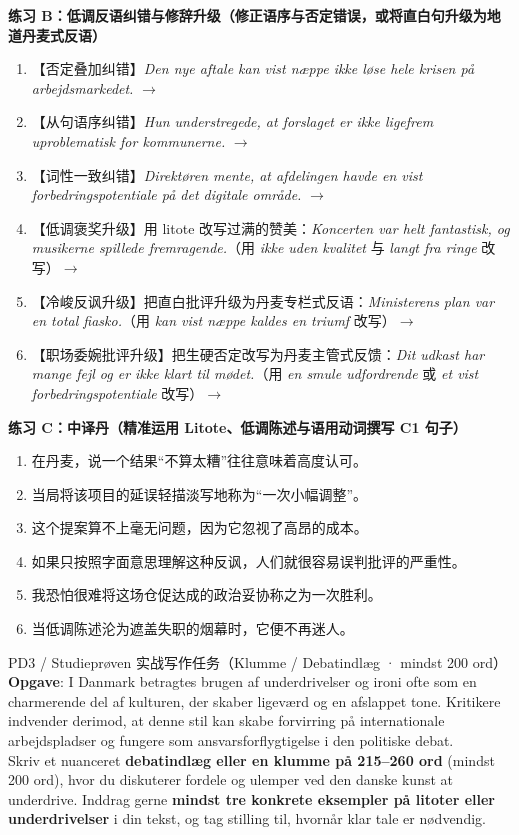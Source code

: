 \textbf{练习 B：低调反语纠错与修辞升级（修正语序与否定错误，或将直白句升级为地道丹麦式反语）}
\begin{enumerate}
  \item 【否定叠加纠错】\textit{Den nye aftale kan vist næppe ikke løse hele krisen på arbejdsmarkedet.} $\rightarrow$
  \item 【从句语序纠错】\textit{Hun understregede, at forslaget er ikke ligefrem uproblematisk for kommunerne.} $\rightarrow$
  \item 【词性一致纠错】\textit{Direktøren mente, at afdelingen havde en vist forbedringspotentiale på det digitale område.} $\rightarrow$
  \item 【低调褒奖升级】用 litote 改写过满的赞美：\textit{Koncerten var helt fantastisk, og musikerne spillede fremragende.}（用 \textit{ikke uden kvalitet} 与 \textit{langt fra ringe} 改写）$\rightarrow$
  \item 【冷峻反讽升级】把直白批评升级为丹麦专栏式反语：\textit{Ministerens plan var en total fiasko.}（用 \textit{kan vist næppe kaldes en triumf} 改写）$\rightarrow$
  \item 【职场委婉批评升级】把生硬否定改写为丹麦主管式反馈：\textit{Dit udkast har mange fejl og er ikke klart til mødet.}（用 \textit{en smule udfordrende} 或 \textit{et vist forbedringspotentiale} 改写）$\rightarrow$
\end{enumerate}

\textbf{练习 C：中译丹（精准运用 Litote、低调陈述与语用动词撰写 C1 句子）}
\begin{enumerate}
  \item 在丹麦，说一个结果“不算太糟”往往意味着高度认可。
  \item 当局将该项目的延误轻描淡写地称为“一次小幅调整”。
  \item 这个提案算不上毫无问题，因为它忽视了高昂的成本。
  \item 如果只按照字面意思理解这种反讽，人们就很容易误判批评的严重性。
  \item 我恐怕很难将这场仓促达成的政治妥协称之为一次胜利。
  \item 当低调陈述沦为遮盖失职的烟幕时，它便不再迷人。
\end{enumerate}


\begin{emailbox}{PD3 / Studieprøven 实战写作任务（Klumme / Debatindlæg · mindst 200 ord）}
\textbf{Opgave}: I Danmark betragtes brugen af underdrivelser og ironi ofte som en charmerende del af kulturen, der skaber ligeværd og en afslappet tone. Kritikere indvender derimod, at denne stil kan skabe forvirring på internationale arbejdspladser og fungere som ansvarsforflygtigelse i den politiske debat.\\[3pt]
Skriv et nuanceret \textbf{debatindlæg eller en klumme på 215--260 ord} (mindst 200 ord), hvor du diskuterer fordele og ulemper ved den danske kunst at underdrive. Inddrag gerne \textbf{mindst tre konkrete eksempler på litoter eller underdrivelser} i din tekst, og tag stilling til, hvornår klar tale er nødvendig.
\end{emailbox}

